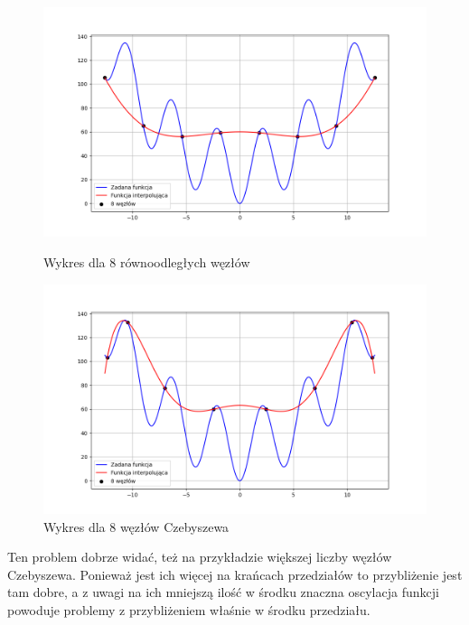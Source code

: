 \documentclass{article}
\begin{document}
\begin{figure}[H]
  \begin{minipage}[b]{0.49\textwidth}
    \includegraphics[width=\textwidth]{img01__n=8.png}
    \caption{Wykres dla 8 równoodległych węzłów}
  \end{minipage}
  \hfill
  \begin{minipage}[b]{0.49\textwidth}
    \includegraphics[width=\textwidth]{img02__n=8.png}
    \caption{Wykres dla 8 węzłów Czebyszewa}
  \end{minipage}
\end{figure}

Ten problem dobrze widać, też na przykładzie większej liczby węzłów Czebyszewa. Ponieważ jest ich więcej na krańcach przedziałów to przybliżenie jest tam dobre, a z uwagi na ich mniejszą ilość w środku 
znaczna oscylacja funkcji powoduje problemy z przybliżeniem właśnie w środku przedziału.
\end{document}
